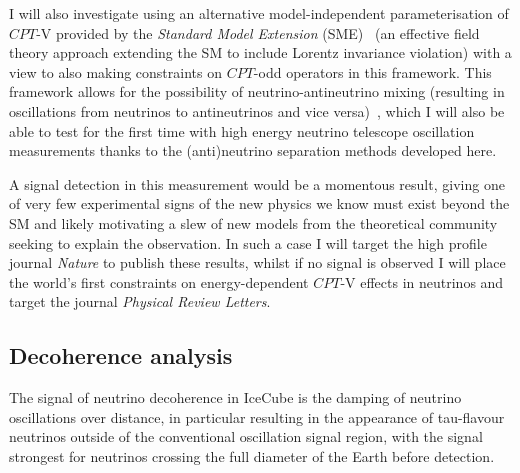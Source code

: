 \documentclass[a4paper,11pt]{article}
\newcounter{bar}
\begin{document}
I will also investigate using an alternative model-independent parameterisation of $CPT$-V provided by the \textit{Standard Model Extension} (SME)~\cite{Kostelecky:2011gq} (an effective field theory approach extending the SM to include Lorentz invariance violation) with a view to also making constraints on $CPT$-odd operators in this framework. This framework allows for the possibility of neutrino-antineutrino mixing (resulting in oscillations from neutrinos to antineutrinos and vice versa)~\cite{Mufson:2013yia}, which I will also be able to test for the first time with high energy neutrino telescope oscillation measurements thanks to the (anti)neutrino separation methods developed here.
 
A signal detection in this measurement would be a momentous result, giving one of very few experimental signs of the new physics we know must exist beyond the SM and likely motivating a slew of new models from the theoretical community seeking to explain the observation. In such a case I will target the high profile journal \textit{Nature} to publish these results, whilst if no signal is observed I will place the world's first constraints on energy-dependent $CPT$-V effects in neutrinos and target the journal \textit{Physical Review Letters}.\\

\subsection{Decoherence analysis}



The signal of neutrino decoherence in IceCube is the damping of neutrino oscillations over distance, in particular resulting in the appearance of tau-flavour neutrinos outside of the conventional oscillation signal region, with the signal strongest for neutrinos crossing the full diameter of the Earth before detection. 
\end{document}
